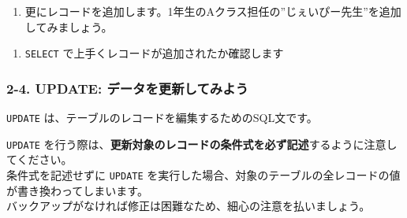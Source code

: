 \begin{enumerate}
\def\labelenumi{\arabic{enumi}.}
\setcounter{enumi}{2}
\tightlist
\item
  更にレコードを追加します。1年生のAクラス担任の''じぇいぴー先生''を追加してみましょう。
\end{enumerate}

\begin{Shaded}
\begin{Highlighting}[]
\NormalTok{\# }
 \OperatorTok{*} \OperatorTok{=}  \OperatorTok{=} \NormalTok{;}

\NormalTok{\# }
 
\NormalTok{) }\NormalTok{ (}
\NormalTok{, }
\NormalTok{);}
\end{Highlighting}
\end{Shaded}

\begin{enumerate}
\def\labelenumi{\arabic{enumi}.}
\setcounter{enumi}{3}
\tightlist
\item
  \texttt{SELECT} で上手くレコードが追加されたか確認します
\end{enumerate}

\begin{Shaded}
\begin{Highlighting}[]
 \OperatorTok{*} 
\end{Highlighting}
\end{Shaded}

\subsubsection{2-4. UPDATE:
データを更新してみよう}\label{update-ux30c7ux30fcux30bfux3092ux66f4ux65b0ux3057ux3066ux307fux3088ux3046}

\texttt{UPDATE} は、テーブルのレコードを編集するためのSQL文です。

\texttt{UPDATE}
を行う際は、\textbf{更新対象のレコードの条件式を必ず記述}するように注意してください。\\
条件式を記述せずに \texttt{UPDATE}
を実行した場合、対象のテーブルの全レコードの値が書き換わってしまいます。\\
バックアップがなければ修正は困難なため、細心の注意を払いましょう。


